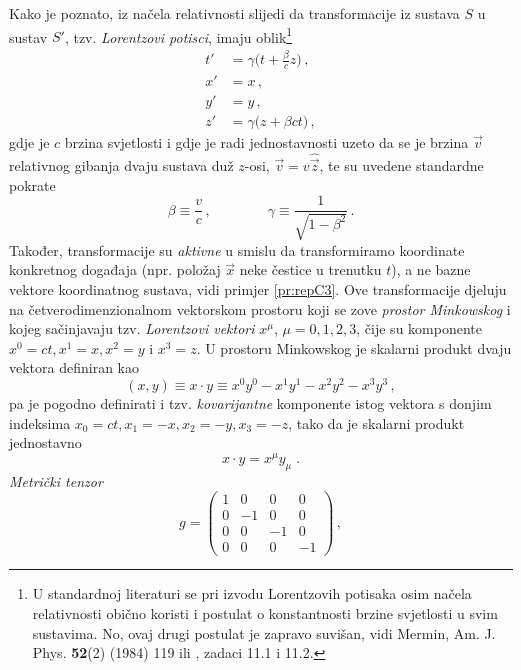 Kako je poznato, iz načela relativnosti slijedi da
transformacije iz sustava $S$ u sustav $S'$, 
tzv. \emph{Lorentzovi potisci}, imaju oblik\footnote{U
standardnoj literaturi se pri izvodu Lorentzovih potisaka osim načela
relativnosti obično koristi i postulat o konstantnosti brzine svjetlosti
u svim sustavima.  No, ovaj drugi postulat je zapravo suvišan, vidi
Mermin, Am. J. Phys. \textbf{52}(2) (1984) 119 ili
\cite{Jackson:1998}, zadaci 11.1 i 11.2.}
\begin{align}
t' &= \gamma \big(t+\frac{\beta}{c}z\big) \,, \\
x' &= x \,, \\
y' &= y \,,  \\
z' &= \gamma \big(z+\beta ct \big) \,,
\end{align}
gdje je $c$ brzina svjetlosti i
gdje je radi jednostavnosti uzeto da se je brzina $\vec{v}$ relativnog gibanja
dvaju sustava duž $z$-osi, $\vec{v}=v\hat{\vec{z}}$, te su uvedene standardne pokrate
\begin{displaymath}
 \beta \equiv \frac{v}{c} \,, \qquad \qquad \gamma\equiv\frac{1}{
\sqrt{1-\beta^2}} \,.
\end{displaymath}
Također, transformacije su \emph{aktivne} u smislu da transformiramo koordinate
konkretnog događaja (npr. položaj $\vec{x}$ neke čestice u trenutku $t$), a ne
bazne vektore koordinatnog sustava, vidi primjer \ref{pr:repC3}.
Ove transformacije djeluju na četverodimenzionalnom vektorskom prostoru koji
se zove \emph{prostor Minkowskog} i kojeg sačinjavaju tzv. 
\emph{Lorentzovi vektori} 
$x^\mu$,  $\mu=0,1,2,3$, čije su komponente  $x^0=ct, x^1=x, x^2=y$ i $x^3=z$.
U prostoru Minkowskog je skalarni produkt dvaju vektora definiran kao
\begin{equation}
    (x, y) \equiv x \cdot y \equiv x^0 y^0 - x^1 y^1 - x^2 y^2 - x^3 y^3 \,,
    \label{eq:produktminkowskog}
\end{equation}
pa je  pogodno definirati i tzv. \emph{kovarijantne}
komponente istog vektora s donjim indeksima
$x_0=ct, x_1=-x, x_2=-y, x_3=-z$, tako da je skalarni produkt jednostavno
\begin{equation}
x \cdot y = x^{\mu} y_{\mu} \;.
\end{equation}
\emph{Metrički tenzor} 
\begin{equation}
g = 
\begin{pmatrix}
1 & 0 & 0 & 0 \\
0 &-1 & 0 & 0 \\
0 & 0 &-1 & 0 \\
0 & 0 & 0 &-1
\end{pmatrix} \,,
    \label{eq:metrickitenzor}
\end{equation}
